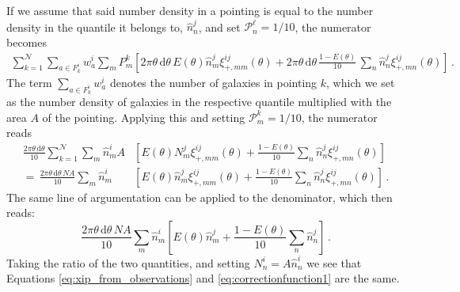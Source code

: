 \documentclass{aa}
\renewcommand{\rm}{\mathrm}
\def\d{\rm{d}}
\begin{document}
\begin{appendix}
If we assume that said number density in a pointing is equal to the number density in the quantile it belongs to, $\hat{n}_n^j$, and set $\mathcal{P}_n^\ell=1/10$, the numerator becomes \begin{align}
\sum_{k=1}^\mathcal{N} \sum_{a\in F_k^i} w_a^i \sum_m P^k_m \left[2\pi\theta\,\d\theta\,E(\theta) \hat{n}_m^j \xi_{+,mm}^{ij}(\theta) + 2\pi\theta\,\d\theta\,\frac{1-E(\theta)}{10}\, \sum_n \hat{n}_n^j \xi_{+,mn}^{ij}(\theta) \right] \, .
\end{align}
The term $\sum_{a\in F_k^i} w_a^i$ denotes the number of galaxies in pointing $k$, which we set as the number density of galaxies in the respective quantile multiplied with the area $A$ of the pointing. Applying this and setting $\mathcal{P}_m^k=1/10$, the numerator reads 
\begin{align}
\frac{2\pi\theta\,\d\theta}{10} \sum_{k=1}^\mathcal{N} \sum_m \hat{n}_m^i A &\left[ E(\theta) N_m^j \xi_{+,mm}^{ij}(\theta) + \frac{1-E(\theta)}{10}\sum_n \hat{n}_n^j\xi_{+,mn}^{ij}(\theta)\right] \nonumber\\
 =  \, \frac{2\pi\theta\,\d\theta \, NA}{10}  \sum_m \hat{n}_m^i &\left[ E(\theta) \hat{n}_m^j \xi_{+,mm}^{ij}(\theta) + \frac{1-E(\theta)}{10}\sum_n \hat{n}_n^j\xi_{+,mn}^{ij}(\theta)\right] \, .
\end{align}
%
 The same line of argumentation can be applied to the denominator, which then reads: \begin{equation}
\frac{2\pi\theta\,\d\theta \, NA}{10}  \sum_m \hat{n}_m^i \left[ E(\theta) \hat{n}_m^j + \frac{1-E(\theta)}{10}\sum_n \hat{n}_n^j\right]\, .
 \end{equation}
Taking the ratio of the two quantities, and setting $N_n^i = A\hat{n}_n^i$ we see that Equations \eqref{eq:xip_from_observations} and \eqref{eq:correctionfunction1} are the same.

\end{appendix}
\end{document}
